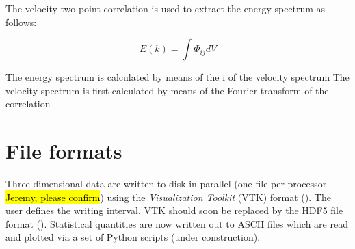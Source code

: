 \documentclass{report}
\begin{document}
The velocity two-point correlation is used to extract the energy spectrum as follows:

\begin{equation}
    E(k) = \int \Phi_{ij}dV
\end{equation}

The energy spectrum is calculated by means of the i of the velocity spectrum The velocity spectrum is first calculated by means of the Fourier transform of the correlation 

\section{File formats}
Three dimensional data are written to disk in parallel (one file per processor \hl{Jeremy, please confirm}) using the {\it Visualization Toolkit} (VTK) format (\cite{vtkWeb}). The user defines the writing interval.
VTK should soon be replaced by the HDF5 file format (\cite{hdf5web}).
Statistical quantities are now written out to ASCII files which are read and plotted via a set of Python scripts (under construction).




\end{document}
